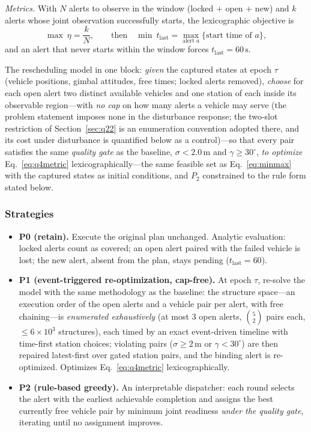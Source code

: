 \emph{Metrics.} With $N$ alerts to observe in the window (locked + open + new) and $k$
alerts whose joint observation successfully starts, the lexicographic objective is
\begin{equation}\label{eq:q4metric}
\max\ \eta=\frac{k}{N},\qquad\text{then}\quad\min\ t_{\mathrm{last}}
=\max_{\text{alert }a}\{\text{start time of }a\},
\end{equation}
and an alert that never starts within the window forces $t_{\mathrm{last}}=60\,\mathrm{s}$.

The rescheduling model in one block: \emph{given} the captured states at epoch $\tau$
(vehicle positions, gimbal attitudes, free times; locked alerts removed), \emph{choose}
for each open alert two distinct available vehicles and one station of each inside its
observable region---with \emph{no cap} on how many alerts a vehicle may serve (the
problem statement imposes none in the disturbance response; the two-slot restriction of
Section~\ref{sec:q22} is an enumeration convention adopted there, and its cost under
disturbance is quantified below as a control)---so that every pair satisfies the same
\emph{quality gate} as the baseline, $\sigma<2.0\,\mathrm{m}$ and
$\gamma\ge30^\circ$, \emph{to optimize} Eq.~\eqref{eq:q4metric}
lexicographically---the same feasible set as Eq.~\eqref{eq:minmax} with the captured
states as initial conditions, and $P_2$ constrained to the rule form stated below.

\subsubsection{Strategies}

\begin{itemize}
\item \textbf{P0 (retain).} Execute the original plan unchanged. Analytic evaluation:
locked alerts count as covered; an open alert paired with the failed vehicle is lost; the
new alert, absent from the plan, stays pending ($t_{\mathrm{last}}=60$).
\item \textbf{P1 (event-triggered re-optimization, cap-free).} At epoch $\tau$, re-solve
the model with the same methodology as the baseline: the structure space---an execution
order of the open alerts and a vehicle pair per alert, with free chaining---is
\emph{enumerated exhaustively} (at most 3 open alerts, $\binom{5}{2}$ pairs each,
$\le6\times10^{3}$ structures), each timed by an exact event-driven timeline with
time-first station choices; violating pairs ($\sigma\ge2\,\mathrm{m}$ or
$\gamma<30^\circ$) are then repaired latest-first over gated station pairs, and the
binding alert is re-optimized. Optimizes Eq.~\eqref{eq:q4metric} lexicographically.
\item \textbf{P2 (rule-based greedy).} An interpretable dispatcher: each round selects the
alert with the earliest achievable completion and assigns the best currently free vehicle
pair by minimum joint readiness \emph{under the quality gate}, iterating until no
assignment improves.
\end{itemize}

